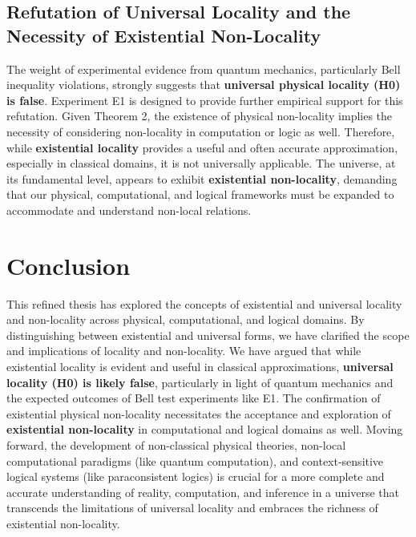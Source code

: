 \documentclass{article}
\begin{document}
	\subsection{Refutation of Universal Locality and the Necessity of Existential Non-Locality}

	The weight of experimental evidence from quantum mechanics, particularly Bell inequality violations, strongly suggests that \textbf{universal physical locality (H0) is false}. Experiment E1 is designed to provide further empirical support for this refutation.  Given Theorem 2, the existence of physical non-locality implies the necessity of considering non-locality in computation or logic as well.  Therefore, while \textbf{existential locality} provides a useful and often accurate approximation, especially in classical domains, it is not universally applicable.  The universe, at its fundamental level, appears to exhibit \textbf{existential non-locality}, demanding that our physical, computational, and logical frameworks must be expanded to accommodate and understand non-local relations.

	\section{Conclusion}

	This refined thesis has explored the concepts of existential and universal locality and non-locality across physical, computational, and logical domains. By distinguishing between existential and universal forms, we have clarified the scope and implications of locality and non-locality. We have argued that while existential locality is evident and useful in classical approximations, \textbf{universal locality (H0) is likely false}, particularly in light of quantum mechanics and the expected outcomes of Bell test experiments like E1.  The confirmation of existential physical non-locality necessitates the acceptance and exploration of \textbf{existential non-locality} in computational and logical domains as well.  Moving forward, the development of non-classical physical theories, non-local computational paradigms (like quantum computation), and context-sensitive logical systems (like paraconsistent logics) is crucial for a more complete and accurate understanding of reality, computation, and inference in a universe that transcends the limitations of universal locality and embraces the richness of existential non-locality.
\end{document}
